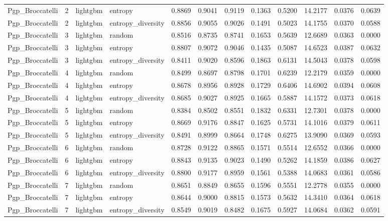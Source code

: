 \begin{tabular}{lrllrrrrrrrr}
Pgp_Broccatelli & 2 & lightgbm & entropy & 0.8869 & 0.9041 & 0.9119 & 0.1363 & 0.5200 & 14.2177 & 0.0376 & 0.0639 \\
Pgp_Broccatelli & 2 & lightgbm & entropy_diversity & 0.8856 & 0.9055 & 0.9026 & 0.1491 & 0.5023 & 14.1755 & 0.0370 & 0.0588 \\
Pgp_Broccatelli & 3 & lightgbm & random & 0.8516 & 0.8735 & 0.8741 & 0.1653 & 0.5639 & 12.6689 & 0.0363 & 0.0000 \\
Pgp_Broccatelli & 3 & lightgbm & entropy & 0.8807 & 0.9072 & 0.9046 & 0.1435 & 0.5087 & 14.6523 & 0.0387 & 0.0632 \\
Pgp_Broccatelli & 3 & lightgbm & entropy_diversity & 0.8411 & 0.9020 & 0.8596 & 0.1863 & 0.6131 & 14.5043 & 0.0378 & 0.0598 \\
Pgp_Broccatelli & 4 & lightgbm & random & 0.8499 & 0.8697 & 0.8798 & 0.1701 & 0.6239 & 12.2179 & 0.0359 & 0.0000 \\
Pgp_Broccatelli & 4 & lightgbm & entropy & 0.8678 & 0.8956 & 0.8928 & 0.1729 & 0.6406 & 14.6902 & 0.0394 & 0.0608 \\
Pgp_Broccatelli & 4 & lightgbm & entropy_diversity & 0.8685 & 0.9027 & 0.8925 & 0.1665 & 0.5887 & 14.1572 & 0.0373 & 0.0618 \\
Pgp_Broccatelli & 5 & lightgbm & random & 0.8384 & 0.8502 & 0.8551 & 0.1832 & 0.6331 & 12.7301 & 0.0378 & 0.0000 \\
Pgp_Broccatelli & 5 & lightgbm & entropy & 0.8669 & 0.9176 & 0.8847 & 0.1625 & 0.5731 & 14.1016 & 0.0379 & 0.0611 \\
Pgp_Broccatelli & 5 & lightgbm & entropy_diversity & 0.8491 & 0.8999 & 0.8664 & 0.1748 & 0.6275 & 13.9090 & 0.0369 & 0.0593 \\
Pgp_Broccatelli & 6 & lightgbm & random & 0.8728 & 0.9122 & 0.8865 & 0.1571 & 0.5514 & 12.6552 & 0.0366 & 0.0000 \\
Pgp_Broccatelli & 6 & lightgbm & entropy & 0.8843 & 0.9135 & 0.9023 & 0.1490 & 0.5262 & 14.1859 & 0.0386 & 0.0627 \\
Pgp_Broccatelli & 6 & lightgbm & entropy_diversity & 0.8800 & 0.9177 & 0.8959 & 0.1561 & 0.5388 & 14.0683 & 0.0361 & 0.0586 \\
Pgp_Broccatelli & 7 & lightgbm & random & 0.8651 & 0.8849 & 0.8655 & 0.1596 & 0.5551 & 12.2778 & 0.0355 & 0.0000 \\
Pgp_Broccatelli & 7 & lightgbm & entropy & 0.8644 & 0.9000 & 0.8815 & 0.1573 & 0.5632 & 14.3410 & 0.0364 & 0.0618 \\
Pgp_Broccatelli & 7 & lightgbm & entropy_diversity & 0.8549 & 0.9019 & 0.8482 & 0.1675 & 0.5927 & 14.0684 & 0.0362 & 0.0591 \\

\end{tabular}
